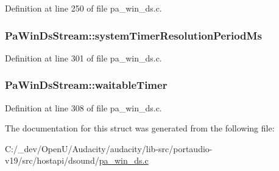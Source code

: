 Definition at line 250 of file pa\+\_\+win\+\_\+ds.\+c.

\subsubsection[{\texorpdfstring{system\+Timer\+Resolution\+Period\+Ms}{systemTimerResolutionPeriodMs}}]{ Pa\+Win\+Ds\+Stream\+::system\+Timer\+Resolution\+Period\+Ms}\hypertarget{struct_pa_win_ds_stream_a9f8a44a7ad81453d30b6de38ea282b13}{}\label{struct_pa_win_ds_stream_a9f8a44a7ad81453d30b6de38ea282b13}


Definition at line 301 of file pa\+\_\+win\+\_\+ds.\+c.

\subsubsection[{\texorpdfstring{waitable\+Timer}{waitableTimer}}]{ Pa\+Win\+Ds\+Stream\+::waitable\+Timer}\hypertarget{struct_pa_win_ds_stream_a211f515019c8fc899f1cee1bb3514db4}{}\label{struct_pa_win_ds_stream_a211f515019c8fc899f1cee1bb3514db4}


Definition at line 308 of file pa\+\_\+win\+\_\+ds.\+c.



The documentation for this struct was generated from the following file\+:\begin{DoxyCompactItemize}
\item 
C\+:/\+\_\+dev/\+Open\+U/\+Audacity/audacity/lib-\/src/portaudio-\/v19/src/hostapi/dsound/\hyperlink{pa__win__ds_8c}{pa\+\_\+win\+\_\+ds.\+c}\end{DoxyCompactItemize}
